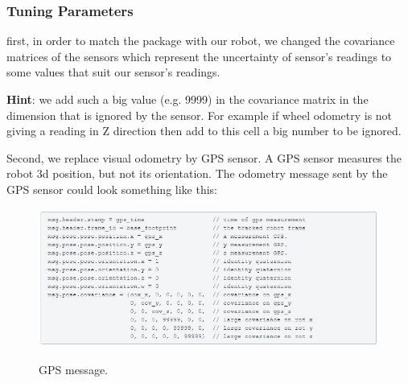  
\subsubsection{Tuning Parameters}
\hspace{2cm} 
first, in order to match the package with our robot, we changed the covariance matrices of the sensors which represent the uncertainty of sensor's readings to some values that suit our sensor's readings.
\par 
\textbf{Hint}: we add such a big value (e.g. 9999) in the covariance matrix in the dimension that is ignored by the sensor. For example if wheel odometry is not giving a reading in Z direction then add to this cell a big number to be ignored.

\par
Second, we replace visual odometry by GPS sensor. A GPS sensor measures the robot 3d position, but not its orientation. The odometry message sent by the GPS sensor could look something like this:

 \begin{figure}[H]%
    \center%
    \includegraphics[width=1.0\textwidth]{images/Alaa/gps.JPG}%
    \caption[GPS message]{GPS message.}\cite{web037}\label{fig: GPS message}%
  \end{figure}

